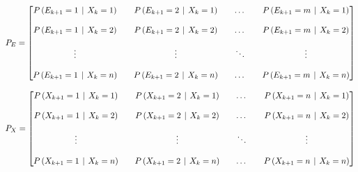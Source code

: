 \documentclass[12pt,a4paper]{article}
\begin{document}
\bigskip
$$
P_E=
\left[
\begin{matrix}
P\left(E_{k+1}=1 \hspace{4pt}|\hspace{4pt} X_k=1\right)&&
P\left(E_{k+1}=2 \hspace{4pt}|\hspace{4pt} X_k=1\right)&&
\dots&&
P\left(E_{k+1}=m \hspace{4pt}|\hspace{4pt} X_k=1\right)\cr\cr
P\left(E_{k+1}=1 \hspace{4pt}|\hspace{4pt} X_k=2\right)&&
P\left(E_{k+1}=2 \hspace{4pt}|\hspace{4pt} X_k=2\right)&&
\dots&&
P\left(E_{k+1}=m \hspace{4pt}|\hspace{4pt} X_k=2\right)\cr\cr
\vdots&&
\vdots&&
\ddots&&
\vdots\cr\cr
P\left(E_{k+1}=1 \hspace{4pt}|\hspace{4pt} X_k=n\right)&&
P\left(E_{k+1}=2 \hspace{4pt}|\hspace{4pt} X_k=n\right)&&
\dots&&
P\left(E_{k+1}=m \hspace{4pt}|\hspace{4pt} X_k=n\right)
\end{matrix}
\right]
$$

\bigskip
$$
P_X=
\left[
\begin{matrix}
P\left(X_{k+1}=1 \hspace{4pt}|\hspace{4pt} X_k=1\right)&&
P\left(X_{k+1}=2 \hspace{4pt}|\hspace{4pt} X_k=1\right)&&
\dots&&
P\left(X_{k+1}=n \hspace{4pt}|\hspace{4pt} X_k=1\right)\cr\cr
P\left(X_{k+1}=1 \hspace{4pt}|\hspace{4pt} X_k=2\right)&&
P\left(X_{k+1}=2 \hspace{4pt}|\hspace{4pt} X_k=2\right)&&
\dots&&
P\left(X_{k+1}=n \hspace{4pt}|\hspace{4pt} X_k=2\right)\cr\cr
\vdots&&
\vdots&&
\ddots&&
\vdots\cr\cr
P\left(X_{k+1}=1 \hspace{4pt}|\hspace{4pt} X_k=n\right)&&
P\left(X_{k+1}=2 \hspace{4pt}|\hspace{4pt} X_k=n\right)&&
\dots&&
P\left(X_{k+1}=n \hspace{4pt}|\hspace{4pt} X_k=n\right)
\end{matrix}
\right]
$$
\end{document}
